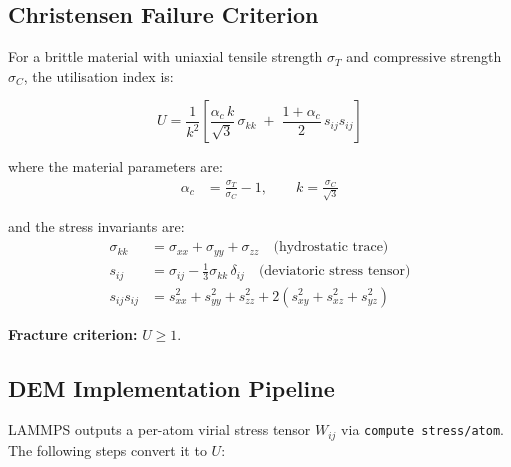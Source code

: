 \documentclass{article}
\begin{document}
\subsection{Christensen Failure Criterion}

For a brittle material with uniaxial tensile strength $\sigma_T$ and
compressive strength $\sigma_C$, the utilisation index is:

\begin{equation}
    U = \frac{1}{k^2}
        \left[
            \frac{\alpha_c \, k}{\sqrt{3}} \, \sigma_{kk}
            \;+\;
            \frac{1 + \alpha_c}{2} \, s_{ij} s_{ij}
        \right]
\end{equation}

where the material parameters are:
\begin{align}
    \alpha_c &= \frac{\sigma_T}{\sigma_C} - 1, \qquad
    k        = \frac{\sigma_C}{\sqrt{3}}
\end{align}

and the stress invariants are:
\begin{align}
    \sigma_{kk}  &= \sigma_{xx} + \sigma_{yy} + \sigma_{zz}
                   \quad\text{(hydrostatic trace)} \\[4pt]
    s_{ij}       &= \sigma_{ij} - \tfrac{1}{3}\sigma_{kk}\,\delta_{ij}
                   \quad\text{(deviatoric stress tensor)} \\[4pt]
    s_{ij}s_{ij} &= s_{xx}^2 + s_{yy}^2 + s_{zz}^2
                   + 2\!\left(s_{xy}^2 + s_{xz}^2 + s_{yz}^2\right)
\end{align}

\noindent\textbf{Fracture criterion:} $U \geq 1$.

\subsection{DEM Implementation Pipeline}

LAMMPS outputs a per-atom virial stress tensor $W_{ij}$ via
\texttt{compute stress/atom}.  The following steps convert it to $U$:
\end{document}

